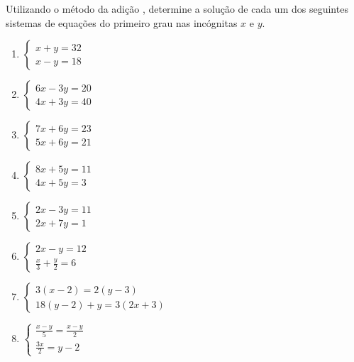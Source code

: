 	\item Utilizando o método da adição , determine a solução de cada um dos seguintes sistemas de equações do primeiro grau nas incógnitas $x$ e $y$.
	\begin{multicols}{2}	
	\begin{enumerate}
		\item $\begin{cases} x+y=32\\ x-y=18\end{cases}$
		\item $\begin{cases} 6x-3y=20\\ 4x+3y=40\end{cases}$
		\item $\begin{cases}	7x+6y=23\\ 5x+6y=21\end{cases}$
		\item $\begin{cases} 8x+5y=11\\ 4x+5y=3\end{cases}$
		\item $\begin{cases}	2x-3y=11\\ 2x+7y=1\end{cases}$
		\item $\begin{cases} 2x-y=12\\ \displaystyle\frac{x}{3}+ \frac{y}{2}=6\end{cases}$
		\item $\begin{cases}	3(x-2)=2(y-3)\\ 18(y-2)+y=3(2x+3)\end{cases}$
		\item $\begin{cases}	\displaystyle\frac{x-y}{5}=\frac{x-y}{2}\\ \displaystyle\frac{3x}{2}=y-2 \end{cases}$
	\end{enumerate}
	\end{multicols}
	
